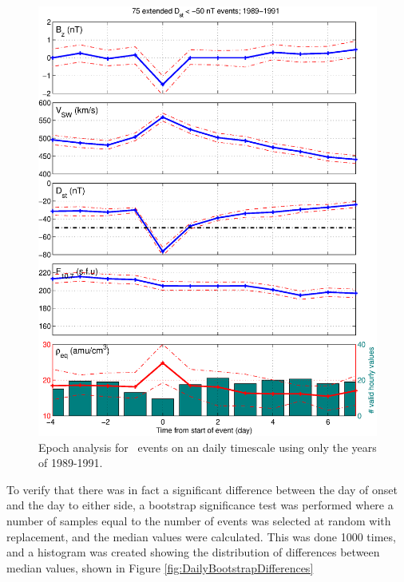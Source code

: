 \begin{figure}[htp!]
	\centering
	\includegraphics[width=1\linewidth]{Figures/StormAvs/stormavs-dst-50-tak-GOES6}
	\caption{Epoch analysis for \dst\ events on an daily timescale using only the years of 1989-1991.}
	\label{fig:EpochDstDayTakahashi}
\end{figure}



To verify that there was in fact a significant difference between the day of onset and the day to either side, a bootstrap significance test was performed where a number of samples equal to the number of events was selected at random with replacement, and the median values were calculated. This was done 1000 times, and a histogram was created showing the distribution of differences between median values, shown in Figure \ref{fig:DailyBootstrapDifferences}

